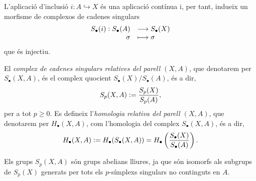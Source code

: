 \documentclass[../main.tex]{subfiles}
\begin{document}
L'aplicació d'inclusió $i:A\hookrightarrow X$ és una aplicació contínua i, per tant, indueix un morfisme de complexos de cadenes singulars
\begin{equation}
    \notag
    \begin{array}{rl}
        S_\bullet(i):S_\bullet(A) & \longrightarrow S_\bullet(X) \\
        \sigma & \longmapsto\sigma
    \end{array}
\end{equation}
que és injectiu.

\begin{defi}
El \textit{complex de cadenes singulars relatives del parell $(X,A)$}, que denotarem per $S_\bullet(X,A)$, és el complex quocient $S_\bullet(X)/S_\bullet(A)$, és a dir,
\begin{equation}
    \notag
    S_p(X,A):=\frac{S_p(X)}{S_p(A)},
\end{equation}
per a tot $p\geq 0$. Es defineix l'\textit{homologia relativa del parell $(X,A)$}, que denotarem per $H_\bullet(X,A)$, com l'homologia del complex $S_\bullet(X,A)$, és a dir,
\begin{equation}
    \notag
    H_\bullet(X,A):=H_\bullet(S_\bullet(X,A)) = H_\bullet\left(\frac{S_\bullet(X)}{S_\bullet(A)}\right).
\end{equation}  
\end{defi}

Els grups $S_p(X,A)$ són grups abelians lliures, ja que són isomorfs als subgrups de $S_p(X)$ generats per tots els $p$-símplexs singulars no continguts en $A$.
\end{document}
